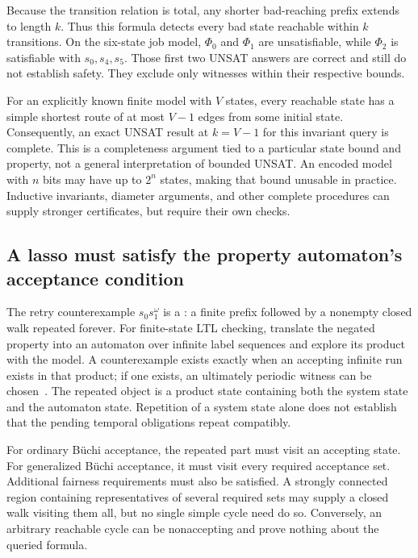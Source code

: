 Because the transition relation is total, any shorter bad-reaching prefix extends to length $k$.
Thus this formula detects every bad state reachable within $k$ transitions.
On the six-state job model, $\Phi_0$ and $\Phi_1$ are unsatisfiable, while $\Phi_2$ is satisfiable with $s_0,s_4,s_5$.
Those first two UNSAT answers are correct and still do not establish safety.
They exclude only witnesses within their respective bounds.

For an explicitly known finite model with $V$ states, every reachable state has a simple shortest route of at most $V-1$ edges from some initial state.
Consequently, an exact UNSAT result at $k=V-1$ for this invariant query is complete.
This is a completeness argument tied to a particular state bound and property, not a general interpretation of bounded UNSAT.
An encoded model with $n$ bits may have up to $2^n$ states, making that bound unusable in practice.
Inductive invariants, diameter arguments, and other complete procedures can supply stronger certificates, but require their own checks.

\subsection{A lasso must satisfy the property automaton's acceptance condition}
\label{sec:ch46-lassos}

The retry counterexample $s_0s_1^\omega$ is a : a finite prefix followed by a nonempty closed walk repeated forever.
For finite-state LTL checking, translate the negated property into an automaton over infinite label sequences and explore its product with the model.
A counterexample exists exactly when an accepting infinite run exists in that product; if one exists, an ultimately periodic witness can be chosen~\cite{baier-2008-model-checking}.
The repeated object is a product state containing both the system state and the automaton state.
Repetition of a system state alone does not establish that the pending temporal obligations repeat compatibly.

For ordinary B\"uchi acceptance, the repeated part must visit an accepting state.
For generalized B\"uchi acceptance, it must visit every required acceptance set.
Additional fairness requirements must also be satisfied.
A strongly connected region containing representatives of several required sets may supply a closed walk visiting them all, but no single simple cycle need do so.
Conversely, an arbitrary reachable cycle can be nonaccepting and prove nothing about the queried formula.

